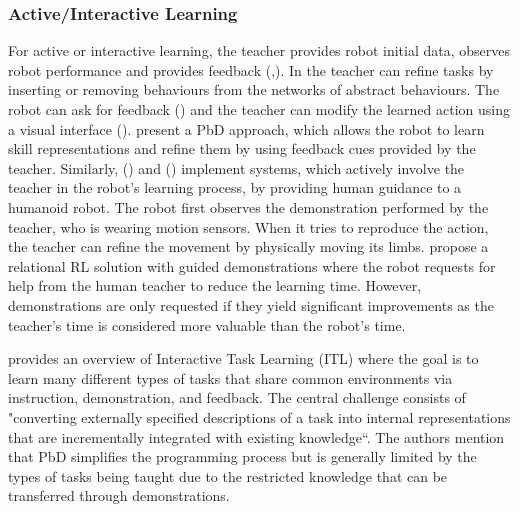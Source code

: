 \subsubsection{Active/Interactive Learning}\label{sssec:Active Learning} 
For active or interactive learning, the teacher provides robot initial data, observes robot performance and provides feedback (\cite{chernova2014robot},\cite{calinon2007active}).
In \cite{nicolescu2003natural} the teacher can refine tasks by inserting or removing behaviours from the networks of abstract behaviours.
The robot can ask for feedback (\cite{cakmak2012aaai}) and the teacher can modify the learned action using a visual interface (\cite{alexandrova2015roboflow}).
\cite{nicolescu2003natural} present a PbD approach, which allows the robot to learn skill representations and refine them by using feedback cues provided by the teacher.
Similarly, (\cite{calinon2007active}) and (\cite{calinon2007incremental}) implement systems, which actively involve the teacher in the robot's learning process, by providing human guidance to a humanoid robot. 
The robot first observes the demonstration performed by the teacher, who is wearing motion sensors. When it tries to reproduce the action, the teacher can refine the movement by physically moving its limbs.
\cite{martinez2017relational} propose a relational RL solution with guided demonstrations where the robot requests for help from the human teacher to reduce the learning time.
However, demonstrations are only requested if they yield significant improvements as the teacher's time is considered more valuable than the robot's time.

\cite{laird2017interactive} provides an overview of Interactive Task Learning (ITL) where the goal is to learn many different types of tasks that share common environments via instruction, demonstration, and feedback. 
The central challenge consists of "converting externally specified descriptions of a task into internal representations that are incrementally integrated with existing knowledge``.
The authors mention that PbD simplifies the programming process but is generally limited by the types of tasks being taught due to the restricted knowledge that can be transferred through demonstrations.




